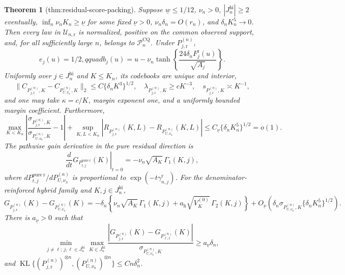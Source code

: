 \documentclass{article}
\newtheorem{theorem}{Theorem}
\begin{document}
\begin{theorem}[thm:residual-score-packing]\label{thm:residual-score-packing}
Suppose \(\underline w\leq1/12\), \(\nu_n>0\), \(|J_n^{\mathrm{hi}}|\geq2\) eventually, \(\inf_n\nu_nK_n\geq\underline\nu\) for some fixed \(\underline\nu>0\), \(\nu_n\delta_n=O(r_n)\), and \(\delta_nK_n^5\to0\).  Then every law in \(\mathcal U_{n,\mathrm r}\) is normalized, positive on the common observed support, and, for all sufficiently large \(n\), belongs to \(\mathcal P_n^{\mathrm{CQ}}\).  Under \(P_{j,\mathrm r}^{(n)}\),
\[
 e_j(u)=1/2,qquad
 b_j(u)=u-\nu_n\tanh\!\left\{\frac{24\delta_nF_{j}^{\mathrm r}(u)}{\sqrt{A_j}}\right\}.
\]
Uniformly over \(j\in J_n^{\mathrm{hi}}\) and \(K\leq K_n\), its codebooks are unique and interior,
\[
 \|C_{P_{j,\mathrm r}^{(n)},K}-C_{P_{U,\nu_n}^{(n)},K}\|_2
 \leq C\{\delta_nK^3\}^{1/2},\quad
 \lambda_{P_{j,\mathrm r}^{(n)},K}\geq cK^{-3},\quad
 s_{P_{j,\mathrm r}^{(n)},K}\asymp K^{-1},
\]
and one may take \(\kappa=c/K\), margin exponent one, and a uniformly bounded margin coefficient.  Furthermore,
\[
 \max_{K<K_n}\left|\frac{\sigma_{P_{j,\mathrm r}^{(n)},K}}
 {\sigma_{P_{U,\nu_n}^{(n)},K}}-1\right|
 +\sup_{K,L<K_n}\left|R_{P_{j,\mathrm r}^{(n)}}(K,L)
 -R_{P_{U,\nu_n}^{(n)}}(K,L)\right|
 \leq C_{\underline\nu}\{\delta_nK_n^5\}^{1/2}=o(1).
\]
The pathwise gain derivative in the pure residual direction is
\[
 \left.\frac{d}{dt}G_{P_{t,j}^{\mathrm{pure\ r}}}(K)\right|_{t=0}
 =-\nu_n\sqrt{A_K}\,\Gamma_1(K,j),
\]
where \(dP_{t,j}^{\mathrm{pure\ r}}/dP_{U,\nu_n}^{(n)}\) is proportional to \(\exp(-t\gamma_{n,j}^{\mathrm r})\).  For the denominator-reinforced hybrid family and \(K,j\in J_n^{\mathrm{hi}}\),
\[
 G_{P_{j,\mathrm r}^{(n)}}(K)-G_{P_{U,\nu_n}^{(n)}}(K)
 =-\delta_n\!\left\{\nu_n\sqrt{A_K}\,\Gamma_1(K,j)
 +a_{\mathrm h}\sqrt{V_K^{(0)}}\,\Gamma_2(K,j)\right\}
 +O_{\underline\nu}\!\left(\delta_n\sigma_{P_{U,\nu_n}^{(n)},K}
 \{\delta_nK_n^5\}^{1/2}\right).
\]
There is \(a_{\underline\nu}>0\) such that
\[
 \min_{j\ne\ell;\,j,\ell\in J_n^{\mathrm{hi}}}\max_{K\in J_n^{\mathrm{hi}}}
 \frac{|G_{P_{j,\mathrm r}^{(n)}}(K)-G_{P_{\ell,\mathrm r}^{(n)}}(K)|}
 {\sigma_{P_{U,\nu_n}^{(n)},K}}
 \geq a_{\underline\nu}\delta_n,
\]
and \(\operatorname{KL}\{(P_{j,\mathrm r}^{(n)})^{\otimes n},(P_{U,\nu_n}^{(n)})^{\otimes n}\}\leq Cn\delta_n^2\).
\end{theorem}
\end{document}
